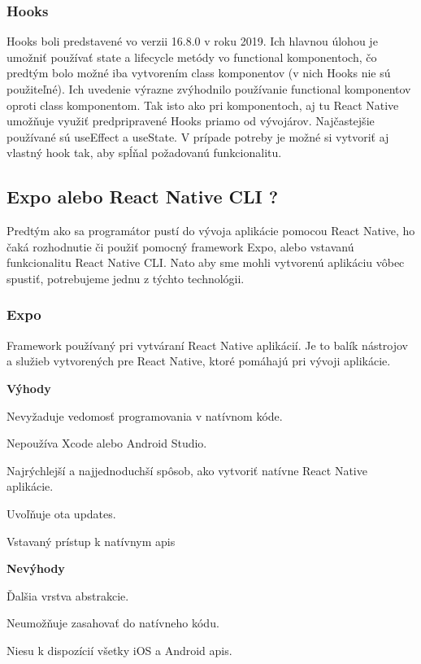 \subsubsection{Hooks}
Hooks boli predstavené vo verzii 16.8.0 v roku 2019. Ich hlavnou úlohou je umožniť používať state a lifecycle metódy vo functional komponentoch, čo predtým bolo možné iba vytvorením class komponentov (v nich Hooks nie sú použiteľné). Ich uvedenie výrazne zvýhodnilo používanie functional komponentov oproti class komponentom. Tak isto ako pri komponentoch, aj tu React Native umožňuje využiť predpripravené Hooks priamo od vývojárov. Najčastejšie používané sú useEffect a useState. V prípade potreby je možné si vytvoriť aj vlastný hook tak, aby spĺňal požadovanú funkcionalitu. \\
\subsection{Expo alebo React Native CLI ?}
Predtým ako sa programátor pustí do vývoja aplikácie pomocou React Native, ho čaká rozhodnutie či použiť pomocný framework Expo, alebo vstavanú funkcionalitu React Native CLI. Nato aby sme mohli vytvorenú aplikáciu vôbec spustiť, potrebujeme jednu z týchto technológii. \\


\subsubsection{Expo}
Framework používaný pri vytváraní React Native aplikácií. Je to balík nástrojov a služieb vytvorených pre React Native, ktoré pomáhajú pri vývoji aplikácie. \newline

{\bf Výhody}
\begin{itemize}
{\item Nevyžaduje vedomosť programovania v natívnom kóde.}
{\item Nepoužíva Xcode alebo Android Studio.} 
{\item Najrýchlejší a najjednoduchší spôsob, ako vytvoriť natívne React Native aplikácie.}
{\item Uvoľňuje \acrshort{ota} updates.} 
{\item Vstavaný prístup k natívnym \acrshort{api}s}
\end{itemize}

{\bf Nevýhody}
\begin{itemize}
{\item Ďalšia vrstva abstrakcie.} 
{\item Neumožňuje zasahovať do natívneho kódu.}
{\item Niesu k dispozícií všetky iOS a Android \acrshort{api}s.}
\end{itemize}
\bigskip

